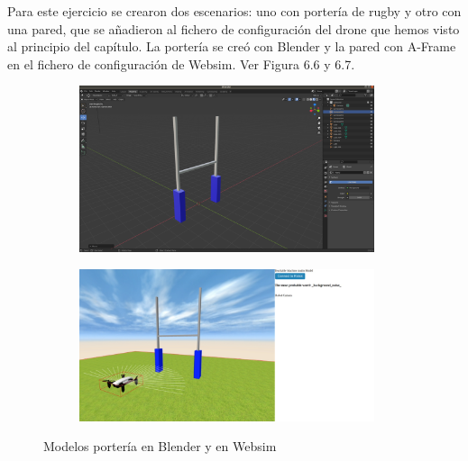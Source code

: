 Para este ejercicio se crearon dos escenarios: uno con portería de rugby y otro con una pared, que se añadieron al  fichero de configuración del drone que hemos visto al principio del capítulo. La portería se creó con Blender y la pared con A-Frame en el fichero de configuración de Websim. Ver Figura 6.6 y 6.7.

 \begin{figure}[H]
  \begin{subfigure}[b]{0.5\textwidth}
  \centering
    \includegraphics[width=0.95\textwidth, height=0.7\textwidth]{chapters/images/porteriablender.png}
    \caption{}
    \label{fig:f1}
  \end{subfigure}
  \hfill
  \begin{subfigure}[b]{0.5\textwidth}
  \centering
    \includegraphics[width=0.95\textwidth, height=0.7\textwidth]{chapters/images/porteriawebsim.png}
	\caption{}    
    \label{fig:f2}
 
  \end{subfigure}
  \caption{Modelos portería en Blender y  en Websim }
\end{figure}


